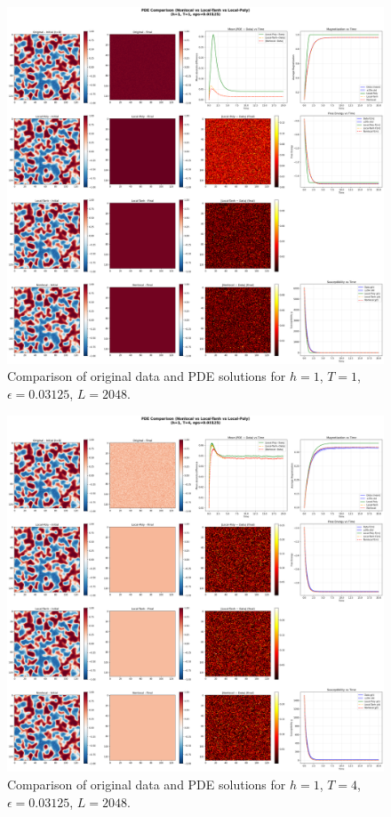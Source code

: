\documentclass[11pt,a4paper]{article}
\begin{document}
\begin{figure}[!h]
    \centering
    \includegraphics[width=1.0\textwidth]{fig/compare_pde_solvers_L2048_h1_T1_eps0.03125.png}
    \caption{Comparison of original data and PDE solutions for $h=1$, $T=1$, $\epsilon=0.03125$, $L=2048$.}
    \label{fig:pde_comparison_h1_T1_eps0.03125_L2048}
\end{figure}


\begin{figure}[h]
    \centering
    \includegraphics[width=1.0\textwidth]{fig/compare_pde_solvers_L2048_h1_T4_eps0.03125.png}
    \caption{Comparison of original data and PDE solutions for $h=1$, $T=4$, $\epsilon=0.03125$, $L=2048$.}
    \label{fig:pde_comparison_h1_T4_eps0.03125_L2048}
\end{figure}
\end{document}
